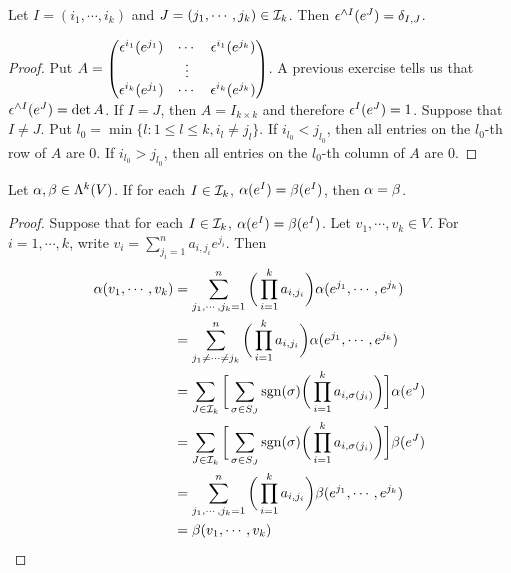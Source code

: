 \documentclass{book}
\begin{document}
	\begin{ex}
		Let $I = (i_1, \cdots, i_k)$ and $J = (j_1, \cdots, j_k) \in \mathcal{I}_k$. Then $\epsilon^{\wedge I} (e^J) = \delta_{I,J}$.
	\end{ex}

	\begin{proof}
		Put $A = \begin{pmatrix}
			\epsilon^{i_1}(e^{j_1}) & \cdots & \epsilon^{i_1}(e^{j_k}) \\
			& \vdots & \\
			\epsilon^{i_k}(e^{j_1}) & \cdots & \epsilon^{i_k}(e^{j_k}) 
		\end{pmatrix}$.
		A previous exercise tells us that $\epsilon^{\wedge I} (e^J) = \det A$.
		If $I = J$, then $A = I_{k\times k}$ and therefore $\epsilon^I(e^J) = 1$. Suppose that $I \neq J$. Put $l_0 = \min \{l: 1 \leq l \leq k, i_l \neq j_l\}$. If $i_{l_0} < j_{l_0}$, then all entries on the $l_0$-th row of $A$ are $0$. If $i_{l_0} > j_{l_0}$, then all entries on the $l_0$-th column of $A$ are $0$.
	\end{proof}

	\begin{ex}
		Let $\alpha , \beta \in \Lambda^k(V)$. If for each $I \in \mathcal{I}_k$, $\alpha(e^I) = \beta(e^I)$, then $\alpha = \beta$.
	\end{ex}

	\begin{proof}
		Suppose that for each $I \in \mathcal{I}_k$, $\alpha(e^I) = \beta(e^I)$. Let $v_1, \cdots, v_k \in V$. For $i = 1, \cdots, k$, write $v_i = \sum_{j_i = 1}^n a_{i,j_i}e^{j_i}$. Then 
		\begin{align*}
			\alpha(v_1, \cdots, v_k) 
			&= \sum_{j_1, \cdots, j_k =1}^n \bigg( \prod_{i=1}^k a_{i, j_i} \bigg) \alpha(e^{j_1}, \cdots, e^{j_k}) \\
			&= \sum_{j_1 \neq \cdots \neq j_k}^n \bigg( \prod_{i=1}^k a_{i, j_i} \bigg) \alpha(e^{j_1}, \cdots, e^{j_k}) \\
			&= \sum_{J \in \mathcal{I}_k} \bigg [ \sum_{\sigma \in S_J} \operatorname{sgn}(\sigma) \bigg( \prod_{i=1}^k a_{i, \sigma(j_i)} \bigg) \bigg] \alpha(e^J) \\
			&= \sum_{J \in \mathcal{I}_k} \bigg [ \sum_{\sigma \in S_J} \operatorname{sgn}(\sigma) \bigg( \prod_{i=1}^k a_{i, \sigma(j_i)} \bigg) \bigg] \beta(e^J) \\
			&= \sum_{j_1, \cdots, j_k =1}^n \bigg( \prod_{i=1}^k a_{i, j_i} \bigg) \beta(e^{j_1}, \cdots, e^{j_k}) \\
			&= \beta(v_1, \cdots, v_k) 
		\end{align*}
	
	\end{proof}
\end{document}
